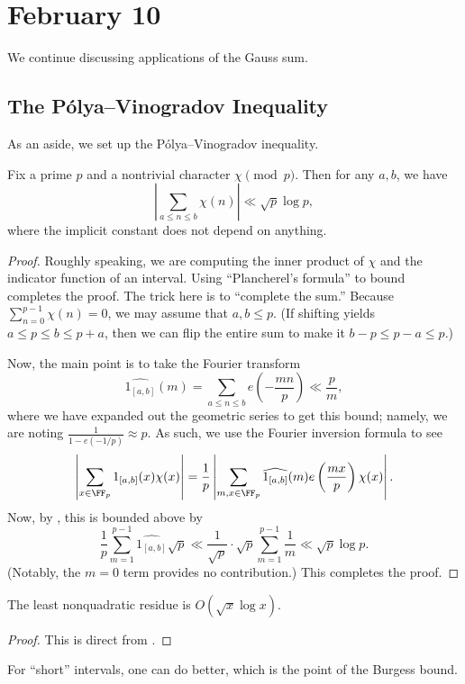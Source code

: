 \documentclass[../notes.tex]{subfiles}
\begin{document}
\section{February 10}

We continue discussing applications of the Gauss sum.

\subsection{The P\'olya--Vinogradov Inequality}
As an aside, we set up the P\'olya--Vinogradov inequality.
\begin{theorem} \label{thm:polya-vinogradov}
	Fix a prime $p$ and a nontrivial character $\chi\pmod p$. Then for any $a,b$, we have
	\[\left|\sum_{a\le n\le b}\chi(n)\right|\ll\sqrt p\log p,\]
	where the implicit constant does not depend on anything.
\end{theorem}
\begin{proof}
	Roughly speaking, we are computing the inner product of $\chi$ and the indicator function of an interval. Using ``Plancherel's formula'' to bound completes the proof. The trick here is to ``complete the sum.'' Because $\sum_{n=0}^{p-1}\chi(n)=0$, we may assume that $a,b\le p$. (If shifting yields $a\le p\le b\le p+a$, then we can flip the entire sum to make it  $b-p\le p-a\le p$.)

	Now, the main point is to take the Fourier transform
	\[\widehat{1_{[a,b]}}(m)=\sum_{a\le n\le b}e\left(-\frac{mn}p\right)\ll\frac pm,\]
	where we have expanded out the geometric series to get this bound; namely, we are noting $\frac1{1-e(-1/p)}\approx p$. As such, we use the Fourier inversion formula  to see
	\[\left|\sum_{x\in\FF_p}1_{[a,b]}(x)\chi(x)\right|=\frac1p\left|\sum_{m,x\in\FF_p}\widehat{1_{[a,b]}}(m)e\left(\frac{mx}p\right)\chi(x)\right|.\]
	Now, by , this is bounded above by
	\[\frac1p\sum_{m=1}^{p-1}\widehat{1_{[a,b]}}\sqrt p\ll\frac1{\sqrt p}\cdot\sqrt p\sum_{m=1}^{p-1}\frac1m\ll\sqrt p\log p.\]
	(Notably, the $m=0$ term provides no contribution.) This completes the proof.
\end{proof}
\begin{corollary}
	The least nonquadratic residue is $O(\sqrt x\log x)$.
\end{corollary}
\begin{proof}
	This is direct from .
\end{proof}
\begin{remark}
	For ``short'' intervals, one can do better, which is the point of the Burgess bound.
\end{remark}
\end{document}
